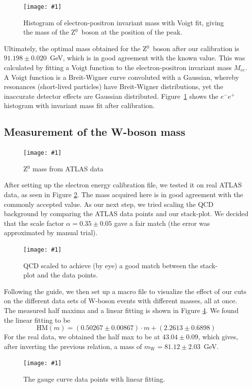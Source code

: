 \documentclass[twocolumn]{article}
\newcommand{\insertFigure}[1]{%
   \texttt{[image: \#1]}%
}
\begin{document}
\begin{figure} [!h]
	\centering
	\insertFigure{Images/FinalIterationLabeled.png}
	\caption{Histogram of electron-positron invariant mass with Voigt fit, giving the mass of the Z$^0$~boson at the position of the peak.}
	\label{fig:final_iteration}
\end{figure}
\par Ultimately, the optimal mass obtained for the Z$^0$~boson after our calibration is $91.198 \pm 0.020$~GeV, which is in good agreement with the known value. This was calculated by fitting a Voigt function to the electron-positron invariant mass $M_{ee}$. A Voigt function is a Breit-Wigner curve convoluted with a Gaussian, whereby resonances (short-lived particles) have Breit-Wigner distributions, yet the inaccurate detector effects are Gaussian distributed.  Figure~\ref{fig:final_iteration} shows the $e^-e^+$ histogram with invariant mass fit after calibration.

\subsection{Measurement of the W-boson mass}
\begin{figure}[!h]
\centering
\insertFigure{Images/FirstWFitLabeled.png}
\caption{Z$^0$ mass from ATLAS data}
\label{fig:Z0ATLAS}
\end{figure}
After setting up the electron energy calibration file, we tested it on real ATLAS data, as seen in Figure \ref{fig:Z0ATLAS}. The mass acquired here is in good agreement with the commonly accepted value. As our next step, we tried scaling the QCD background by comparing the ATLAS data points and our stack-plot. We decided that the scale factor $\alpha = 0.35 \pm 0.05$ gave a fair match (the error was approximated by manual trial).
\begin{figure}[!h]
\centering
\insertFigure{Images/ptw_scaleLabeled.png}
\caption{QCD scaled to achieve (by eye) a good match between the stack-plot and the data points.}
\label{fig:QCDscalefactor}
\end{figure}
Following the guide, we then set up a macro file to visualize the effect of our cuts on the different data sets of W-boson events with different masses, all at once. The measured half maxima and a linear fitting is shown in Figure \ref{fig:gaugecurve}. We found the linear fitting to be
\begin{equation}\nonumber
\text{HM}(m) = (0.50267 \pm 0.00867)\cdot m + (2.2613 \pm 0.6898)
\end{equation}
For the real data, we obtained the half max to be at $43.04 \pm 0.09$, which gives, after inverting the previous relation, a mass of $m_\text{W} = 81.12 \pm 2.03$~GeV.
\begin{figure}[!h]
\centering
\insertFigure{Images/Jacobihalfmax.png}
\caption{The gauge curve data points with linear fitting.}
\label{fig:gaugecurve}
\end{figure}
\end{document}
